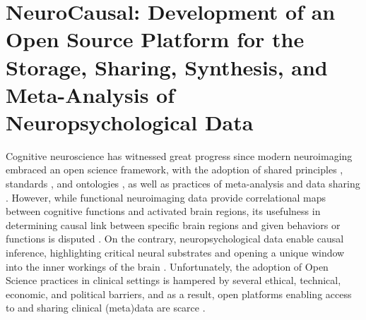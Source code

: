 \documentclass[../main.tex]{subfiles}
\begin{document}
\section{NeuroCausal: Development of an Open Source Platform for the Storage, Sharing, Synthesis, and Meta-Analysis of Neuropsychological Data} 



Cognitive neuroscience has witnessed great progress since modern neuroimaging embraced an open science framework, with the adoption of shared principles \parencite{Wilkinson2016}, standards \parencite{gorgolewski_brain_2016}, and ontologies \parencite{poldrack_cognitive_2011}, as well as practices of meta-analysis\parencite{dockes_neuroquery_2020-1, yarkoni_large-scale_2011} and data sharing \parencite{gorgolewski_neurovaultorg_2015}. However, while functional neuroimaging data provide correlational maps between cognitive functions and activated brain regions, its usefulness in determining causal link between specific brain regions and given behaviors or functions is disputed \parencite{weber_functional_2010, siddiqi_causal_2022}. On the contrary, neuropsychological data enable causal inference, highlighting critical neural substrates and opening a unique window into the inner workings of the brain \parencite{price_evolution_2018}. Unfortunately, the adoption of Open Science practices in clinical settings is hampered by several ethical, technical, economic, and political barriers, and as a result, open platforms enabling access to and sharing clinical (meta)data are scarce \parencite{lariviere_enigma_2021}.
\end{document}
